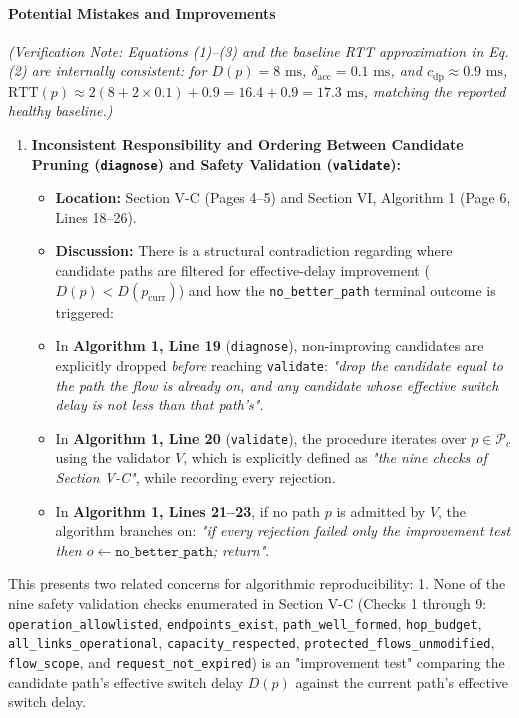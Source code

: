 \documentclass[11pt,a4paper]{article}
\begin{document}
\paragraph{Potential Mistakes and Improvements}
\emph{(Verification Note: Equations (1)–(3) and the baseline RTT approximation in Eq. (2) are internally consistent: for $D(p) = 8\text{ ms}$, $\delta_{\text{acc}} = 0.1\text{ ms}$, and $c_{\text{dp}} \approx 0.9\text{ ms}$, $\text{RTT}(p) \approx 2(8 + 2 \times 0.1) + 0.9 = 16.4 + 0.9 = 17.3\text{ ms}$, matching the reported healthy baseline.)}
\begin{enumerate}[leftmargin=1.6em,itemsep=3pt]
\item \textbf{Inconsistent Responsibility and Ordering Between Candidate Pruning (\texttt{diagnose}) and Safety Validation (\texttt{validate}):}
\begin{itemize}[leftmargin=1.8em,itemsep=2pt]
\item \textbf{Location:} Section V-C (Pages 4–5) and Section VI, Algorithm 1 (Page 6, Lines 18–26).
\item \textbf{Discussion:} There is a structural contradiction regarding where candidate paths are filtered for effective-delay improvement ($D(p) < D(p_{\text{curr}})$) and how the \texttt{no\_better\_path} terminal outcome is triggered:
\item In \textbf{Algorithm 1, Line 19} (\texttt{diagnose}), non-improving candidates are explicitly dropped \emph{before} reaching \texttt{validate}: \emph{"drop the candidate equal to the path the flow is already on, and any candidate whose effective switch delay is not less than that path's"}.
\item In \textbf{Algorithm 1, Line 20} (\texttt{validate}), the procedure iterates over $p \in \mathcal{P}_c$ using the validator $V$, which is explicitly defined as \emph{"the nine checks of Section V-C"}, while recording every rejection.
\item In \textbf{Algorithm 1, Lines 21–23}, if no path $p$ is admitted by $V$, the algorithm branches on: \emph{"if every rejection failed only the improvement test then $o \leftarrow \texttt{no\_better\_path}$; return"}.
\end{itemize}
\end{enumerate}
This presents two related concerns for algorithmic reproducibility:
1. None of the nine safety validation checks enumerated in Section V-C (Checks 1 through 9: \texttt{operation\_allowlisted}, \texttt{endpoints\_exist}, \texttt{path\_well\_formed}, \texttt{hop\_budget}, \texttt{all\_links\_operational}, \texttt{capacity\_respected}, \texttt{protected\_flows\_unmodified}, \texttt{flow\_scope}, and \texttt{request\_not\_expired}) is an "improvement test" comparing the candidate path's effective switch delay $D(p)$ against the current path's effective switch delay.
\end{document}
